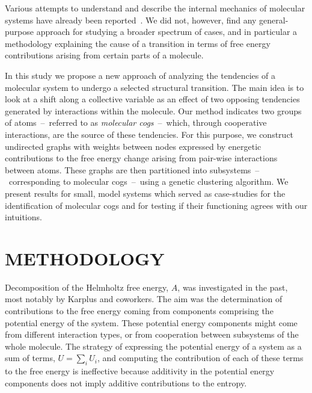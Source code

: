 Various attempts to understand and describe the internal mechanics of {\color{black}molecular systems} have already been reported~\cite{arnautova2011development,bao2009protein,chiang2013molecular,lavery2007protein,sacquin2014motions,van1997engineering,seifert2013protein}.
We did not, however, find any general-purpose approach for studying a broader spectrum of cases, and in particular a methodology explaining the cause of a transition in terms of free energy contributions arising from certain parts of a molecule.

In this study we propose a new approach of analyzing the tendencies of a {\color{black}molecular} system to undergo a selected structural transition.
The main idea is to look at a shift along a collective variable as an effect of two opposing tendencies generated by interactions within the molecule.
Our method {\color{black}indicates} two groups of atoms~--~referred to as \emph{molecular cogs}~--~which, through cooperative interactions, are the source of these tendencies.
For this purpose, we construct undirected graphs with weights between nodes expressed by energetic contributions to the free energy change arising from pair-wise interactions between atoms.
{\color{black}
These graphs are then partitioned into subsystems~--~corresponding to molecular cogs~--~using a genetic clustering algorithm.
We present results for small, model systems which served as case-studies for the identification of molecular cogs and for testing if their functioning agrees with our intuitions.
}


\section*{\sffamily \Large METHODOLOGY}


Decomposition of the Helmholtz free energy, $A$, was investigated in the past, most notably by Karplus and coworkers\cite{boresch1995meaning,brady1995decomposition}.
{\color{black}The aim was the determination of contributions to the free energy coming from components comprising the potential energy of the system.
These potential energy components might come from different interaction types, or from cooperation between subsystems of the whole molecule.}
The strategy of expressing the potential energy of a system as a sum of terms, $U=\sum_i U_i$, and {\color{black}computing} the contribution of each of these terms to the free energy is ineffective because additivity in the potential energy components does not imply additive contributions to the entropy\cite{dill1997additivity}.

